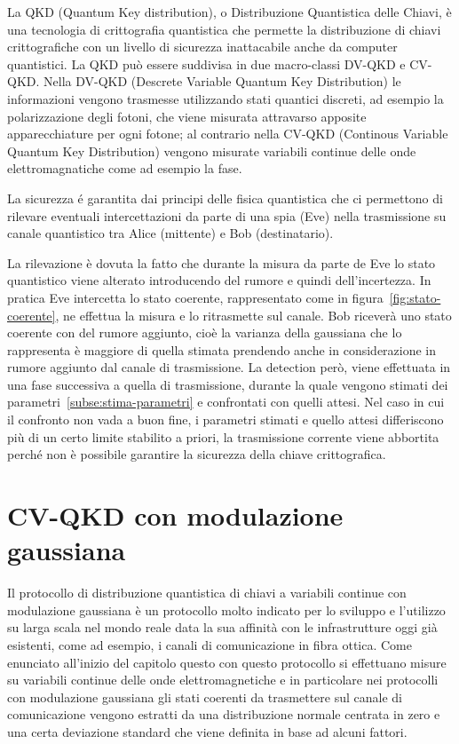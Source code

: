 La QKD (Quantum Key distribution), o Distribuzione Quantistica delle Chiavi, \`e una tecnologia di crittografia quantistica che permette la distribuzione di chiavi crittografiche con un livello di sicurezza inattacabile anche da computer quantistici. La QKD pu\`o essere suddivisa in due macro-classi DV-QKD e CV-QKD. Nella DV-QKD (Descrete Variable Quantum Key Distribution) le informazioni vengono trasmesse utilizzando stati quantici discreti, ad esempio la polarizzazione degli fotoni, che viene misurata attravarso apposite apparecchiature per ogni fotone; al contrario nella CV-QKD (Continous Variable Quantum Key Distribution) vengono misurate variabili continue delle onde elettromagnatiche come ad esempio la fase.

La sicurezza \'e garantita dai principi delle fisica quantistica che ci permettono di rilevare eventuali intercettazioni da parte di una spia (Eve) nella trasmissione su canale quantistico tra Alice (mittente) e Bob (destinatario).

La rilevazione \`e dovuta la fatto che durante la misura da parte de Eve lo stato quantistico viene alterato introducendo del rumore e quindi dell'incertezza. In pratica Eve intercetta lo stato coerente, rappresentato come in figura~\ref{fig:stato-coerente}, ne effettua la misura e lo ritrasmette sul canale. Bob ricever\`a uno stato coerente con del rumore aggiunto, cio\`e la varianza della gaussiana che lo rappresenta \`e maggiore di quella stimata prendendo anche in considerazione in rumore aggiunto dal canale di trasmissione. La detection per\`o, viene effettuata in una fase successiva a quella di trasmissione, durante la quale vengono stimati dei parametri~\ref{subse:stima-parametri} e confrontati con quelli attesi. Nel caso in cui il confronto non vada a buon fine, i parametri stimati e quello attesi differiscono pi\`u di un certo limite stabilito a priori, la trasmissione corrente viene abbortita perch\'e non \`e possibile garantire la sicurezza della chiave crittografica.

\section{CV-QKD con modulazione gaussiana}
Il protocollo di distribuzione quantistica di chiavi a variabili continue con modulazione gaussiana \`e un protocollo molto indicato per lo sviluppo e l'utilizzo su larga scala nel mondo reale data la sua affinit\`a con le infrastrutture oggi gi\`a esistenti, come ad esempio, i canali di comunicazione in fibra ottica. Come enunciato all'inizio del capitolo questo con questo protocollo si effettuano misure su variabili continue delle onde elettromagnetiche e in particolare nei protocolli con modulazione gaussiana gli stati coerenti da trasmettere sul canale di comunicazione vengono estratti da una distribuzione normale centrata in zero e una certa deviazione standard che viene definita in base ad alcuni fattori.

